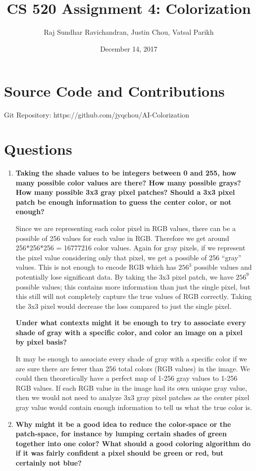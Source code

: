 \documentclass[a4paper]{article}
\title{\textbf{CS 520 Assignment 4: Colorization}}
\author{Raj Sundhar Ravichandran, Justin Chou, Vatsal Parikh}
\date{December 14, 2017}
\begin{document}
\maketitle
\section*{Source Code and Contributions}
Git Repository: https://github.com/jyqchou/AI-Colorization

\section*{Questions}

\begin{enumerate}
\item \textbf{Taking the shade values to be integers between 0 and 255, how many possible color values are there? How many possible grays? How many possible 3x3 gray pixel patches? Should a 3x3 pixel patch be enough information to guess the center color, or not enough?}

Since we are representing each color pixel in RGB values, there can be a possible of 256 values for each value in RGB. Therefore we get around 256*256*256 = 16777216 color values.
Again for gray pixels, if we represent the pixel value considering only that pixel, we get a possible of 256 ``gray'' values. This is not enough to encode RGB which has $256^3$ possible values and potentially lose significant data. By taking the 3x3 pixel patch, we have $256^9$ possible values; this contains more information than just the single pixel, but this still will not completely capture the true values of RGB correctly. Taking the 3x3 pixel would decrease the loss compared to just the single pixel.

\textbf{Under what contexts might it be enough to try to associate every shade of gray with a specific color, and color an image on a pixel by pixel basis?}

It may be enough to associate every shade of gray with a specific color if we are sure there are fewer than 256 total colors (RGB values) in the image. We could then theoretically have a perfect map of 1-256 gray values to 1-256 RGB values. If each RGB value in the image had its own unique gray value, then we would not need to analyze 3x3 gray pixel patches as the center pixel gray value would contain enough information to tell us what the true color is. 
\bigskip
\item \textbf{Why might it be a good idea to reduce the color-space or the patch-space, for instance by lumping certain shades of green together into one color? What should a good coloring algorithm do if it was fairly confident a pixel should be green or red, but certainly not blue?}


\end{enumerate}
\end{document}

